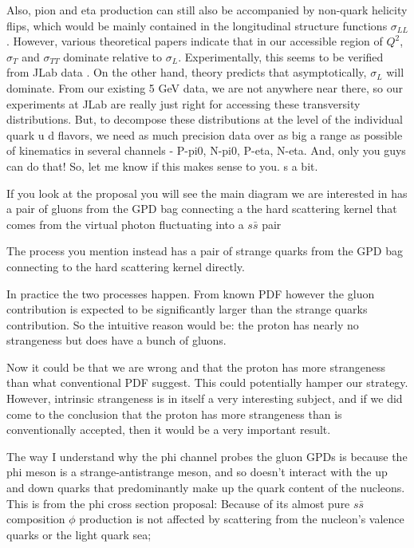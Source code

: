         	Also, pion and eta production can still also be accompanied by non-quark helicity flips, which would be mainly contained in the longitudinal structure functions $\sigma_{LL}$. However, various theoretical papers indicate that in our accessible region of $Q^2$, $\sigma_T$ and $\sigma_{TT}$ dominate relative to $\sigma_L$. Experimentally, this seems to be verified from JLab data .
        	On the other hand, theory predicts that asymptotically, $\sigma_L$ will dominate. From our existing 5 GeV  data, we are not anywhere near there, so our experiments at JLab are really just right for accessing these transversity distributions.  But, to decompose these distributions  at the level of the individual quark u d flavors, we need as much precision data over as big a range as possible of kinematics in several channels - P-pi0, N-pi0, P-eta, N-eta. And, only you guys can do that!
        	So, let me know if this makes sense to you. s a bit. 
        	
            If you look at the proposal you will see the main diagram we are interested in has a pair of gluons from the GPD bag connecting a the hard scattering kernel that comes from the virtual photon fluctuating into a $s\bar{s}$ pair
            
            The process you mention instead has a pair of strange quarks from the GPD bag connecting to the hard scattering kernel directly. 
            
            In practice the two processes happen. From known PDF however the gluon contribution is expected to be significantly larger than the strange quarks contribution. So the intuitive reason would be: the proton has nearly no strangeness but does have a bunch of gluons.
            
            Now it could be that we are wrong and that the proton has more strangeness than what conventional PDF suggest. This could potentially hamper our strategy. However, intrinsic strangeness is in itself a very interesting subject, and if we did come to the conclusion that the proton has more strangeness than is conventionally accepted, then it would be a very important result.
            
            The way I understand why the phi channel probes the gluon GPDs is because the phi meson is a strange-antistrange meson, and so doesn't interact with the up and down quarks that predominantly make up the quark content of the nucleons. This is from the phi cross section proposal: Because of its almost pure $s\bar{s}$ composition $\phi$ production is not affected by scattering from the nucleon’s valence quarks or the light quark sea;
            
